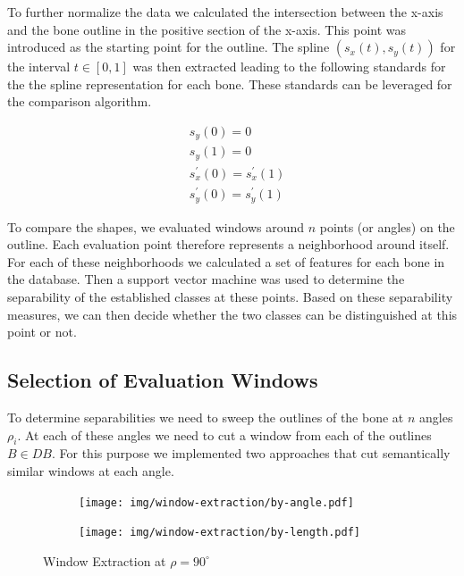 \documentclass[pdftex,12pt,a4paper]{report}
\begin{document}
To further normalize the data we calculated the intersection between the x-axis and the bone outline
in the positive section of the x-axis. This point was introduced as the starting point for the outline.
The spline $(s_x(t), s_y(t))$ for the interval $t \in [0, 1]$ was then extracted leading to the
following standards for the the spline representation for each bone. These standards can be leveraged for the comparison algorithm.

\begin{equation}
\begin{split}
& s_y(0) = 0 \\
& s_y(1) = 0 \\
& s_x^\prime(0) = s_x^\prime(1) \\
& s_y^\prime(0) = s_y^\prime(1)
\end{split}
\end{equation}

To compare the shapes, we evaluated windows around $n$ points (or angles) on the outline. Each evaluation
point therefore represents a neighborhood around itself. For each of these neighborhoods
we calculated a set of features for each bone in the database. Then a support vector machine
was used to determine the separability of the established classes at these points. Based on 
these separability measures, we can then decide whether the two classes can be distinguished
at this point or not. 

\subsection{Selection of Evaluation Windows}

To determine separabilities we need to sweep the outlines of the bone at $n$ angles $\rho_i$. At each of these angles we need to cut a window from each of the outlines $B \in DB$. For this purpose we implemented two approaches that cut semantically similar windows at each angle.

\begin{figure}[h]
	\centering
	\begin{subfigure}[b]{0.32\textwidth}
		\centering
		\texttt{[image: img/window-extraction/by-angle.pdf]}
		\label{fig:window-extraction-angle}
	\end{subfigure}
	\begin{subfigure}[b]{0.32\textwidth}
		\centering
		\texttt{[image: img/window-extraction/by-length.pdf]}
		\label{fig:window-extraction-length}
	\end{subfigure}
	\begin{subfigure}[b]{0.32\textwidth}
		\centering
		\label{fig:window-extraction-all}
	\end{subfigure}
	\caption{Window Extraction at $\rho=90^\circ$}
	\label{fig:window-extraction}
\end{figure}
\end{document}
